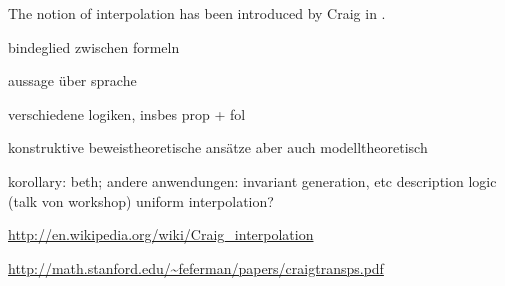 
The notion of interpolation has been introduced by Craig in \cite{Craig57linear}.

bindeglied zwischen formeln

aussage über sprache

verschiedene logiken, insbes prop + fol

konstruktive beweistheoretische ansätze aber auch modelltheoretisch

korollary: beth; andere anwendungen: invariant generation, etc
description logic (talk von workshop)
	uniform interpolation?

\url{http://en.wikipedia.org/wiki/Craig_interpolation}

\url{http://math.stanford.edu/~feferman/papers/craigtransps.pdf}
